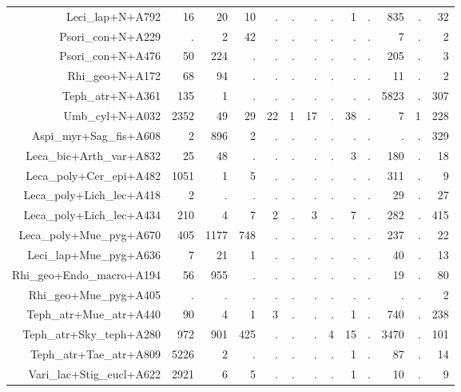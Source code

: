 \documentclass[a4paper, 11]{article}\usepackage[]{graphicx}\usepackage[]{color}
\begin{document}
\begin{table}
\begin{tabular}{rrrrrrrrrrrrr}
  Leci\_lap+N+A792 & 16 & 20 & 10 & . & . & . & . & 1 & . & 835 & . & 32 \\ 
  Psori\_con+N+A229 & . & 2 & 42 & . & . & . & . & . & . & 7 & . & 2 \\ 
  Psori\_con+N+A476 & 50 & 224 & . & . & . & . & . & . & . & 205 & . & 3 \\ 
  Rhi\_geo+N+A172 & 68 & 94 & . & . & . & . & . & . & . & 11 & . & 2 \\ 
  Teph\_atr+N+A361 & 135 & 1 & . & . & . & . & . & . & . & 5823 & . & 307 \\ 
  Umb\_cyl+N+A032 & 2352 & 49 & 29 & 22 & 1 & 17 & . & 38 & . & 7 & 1 & 228 \\ 
  Aspi\_myr+Sag\_fis+A608 & 2 & 896 & 2 & . & . & . & . & . & . & . & . & 329 \\ 
  Leca\_bic+Arth\_var+A832 & 25 & 48 & . & . & . & . & . & 3 & . & 180 & . & 18 \\ 
  Leca\_poly+Cer\_epi+A482 & 1051 & 1 & 5 & . & . & . & . & . & . & 311 & . & 9 \\ 
  Leca\_poly+Lich\_lec+A418 & 2 & . & . & . & . & . & . & . & . & 29 & . & 27 \\ 
  Leca\_poly+Lich\_lec+A434 & 210 & 4 & 7 & 2 & . & 3 & . & 7 & . & 282 & . & 415 \\ 
  Leca\_poly+Mue\_pyg+A670 & 405 & 1177 & 748 & . & . & . & . & . & . & 237 & . & 22 \\ 
  Leci\_lap+Mue\_pyg+A636 & 7 & 21 & 1 & . & . & . & . & . & . & 40 & . & 13 \\ 
  Rhi\_geo+Endo\_macro+A194 & 56 & 955 & . & . & . & . & . & . & . & 19 & . & 80 \\ 
  Rhi\_geo+Mue\_pyg+A405 & . & . & . & . & . & . & . & . & . & . & . & 2 \\ 
  Teph\_atr+Mue\_atr+A440 & 90 & 4 & 1 & 3 & . & . & . & 1 & . & 740 & . & 238 \\ 
  Teph\_atr+Sky\_teph+A280 & 972 & 901 & 425 & . & . & . & 4 & 15 & . & 3470 & . & 101 \\ 
  Teph\_atr+Tae\_atr+A809 & 5226 & 2 & . & . & . & . & . & 1 & . & 87 & . & 14 \\ 
  Vari\_lac+Stig\_eucl+A622 & 2921 & 6 & 5 & . & . & . & . & 1 & . & 10 & . & 9 \\ 
   \hline
\end{tabular}
\end{table}
\end{document}
